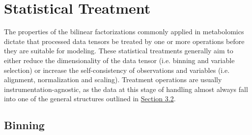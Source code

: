 \section{Statistical Treatment}

\begin{doublespace}
The properties of the bilinear factorizations commonly applied in metabolomics
dictate that processed data tensors be treated by one or more operations before
they are suitable for modeling. These statistical treatments generally aim to
either reduce the dimensionality of the data tensor (i.e. binning and variable
selection) or increase the self-consistency of observations and variables
(i.e. alignment, normalization and scaling). Treatment operations are usually
instrumentation-agnostic, as the data at this stage of handling almost always
fall into one of the general structures outlined in
\hyperlink{section.3.2}{Section 3.2}.
\end{doublespace}

\subsection{Binning}

